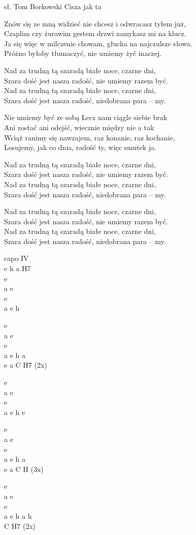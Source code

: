 {sł. Tom Borkowski}
{Cisza jak ta}
\begin{text}
    \hfill\break
    \hfill\break
Znów się ze mną widzieć nie chcesz i odwracasz tyłem już,\\
Czaplim czy żurawim gestem drzwi zamykasz mi na klucz.\\
Ja się więc w milczenie chowam, głucha na najczulsze słowa.\\
Próżno byłoby tłumaczyć, nie umiemy żyć inaczej.

\vin Nad za trudną tą szaradą białe noce, czarne dni,\\
\vin Szara dość jest nasza radość, nie umiemy razem być.\\
\vin Nad za trudną tą szaradą białe noce, czarne dni,\\
\vin Szara dość jest nasza radość, niedobrana para – my.

    \hfill\break
Nie umiemy być ze sobą Lecz nam ciągle siebie brak\\
Ani zostać ani odejść, wiecznie między nie a tak\\
Wciąż ranimy się nawzajem, raz konanie, raz kochanie,\\
Losujemy, jak co dnia, radość ty, więc smutek ja.

\vin Nad za trudną tą szaradą białe noce, czarne dni,\\
\vin Szara dość jest nasza radość, nie umiemy razem być.\\
\vin Nad za trudną tą szaradą białe noce, czarne dni,\\
\vin Szara dość jest nasza radość, niedobrana para – my.

    \hfill\break
\vin Nad za trudną tą szaradą białe noce, czarne dni,\\
\vin Szara dość jest nasza radość, nie umiemy razem być.\\
\vin Nad za trudną tą szaradą białe noce, czarne dni,\\
\vin Szara dość jest nasza radość, niedobrana para – my.

\end{text}
\begin{chord}
\vin capo IV\\
\vin e h a H7\\
e\\
a e\\
e\\
a e h

\vin e\\
\vin a e\\
\vin e\\
\vin a e h a\\
e a C H7 (2x)

e\\
a e\\
e\\
a e h e

\vin e\\
\vin a e\\
\vin e\\
\vin a e h a\\
e a C H (3x)

\vin e\\
\vin a e\\
\vin e\\
\vin a e h a h \\
C H7 (2x)
\end{chord}
